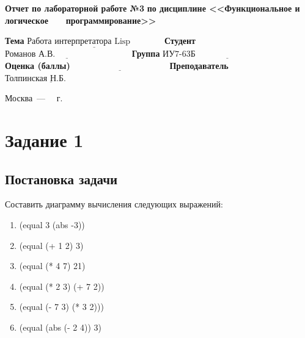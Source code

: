 \documentclass[12pt]{report}
\begin{document}
\begin{titlepage}
		\begin{center}
			\noindent\begin{minipage}{1.1\textwidth}\centering
				\Large\textbf{  Отчет по лабораторной работе №3}\newline
				\textbf{по дисциплине <<Функциональное и логическое}\newline
				\textbf{~~~программирование>>}\newline\newline
			\end{minipage}
		\end{center}
		
		\noindent\textbf{Тема} $\underline{\text{Работа интерпретатора Lisp~~~~~~~~~~~}}$\newline\newline
		\noindent\textbf{Студент} $\underline{\text{Романов А.В.~~~~~~~~~~~~~~~~~~~~~~~~~~}}$\newline\newline
		\noindent\textbf{Группа} $\underline{\text{ИУ7-63Б~~~~~~~~~~~~~~~~~~~~~~~~~~~~~~~~~~}}$\newline\newline
		\noindent\textbf{Оценка (баллы)} $\underline{\text{~~~~~~~~~~~~~~~~~~~~~~~~~~~~~~~~~}}$\newline\newline
		\noindent\textbf{Преподаватель} $\underline{\text{Толпинская Н.Б.~~~~~~~~~~~}}$\newline\newline\newline
		
		\begin{center}
			\vfill
			Москва~---~\the\year
			~г.
		\end{center}
	\end{titlepage}
	
	
	
\section*{Задание 1}
\subsection*{Постановка задачи}

Составить диаграмму вычисления следующих выражений:

\begin{enumerate}
	\item (equal 3 (abs -3))
	\item (equal (+ 1 2) 3)
	\item (equal (* 4 7) 21)
	\item (equal (* 2 3) (+ 7 2))
	\item (equal (- 7 3) (* 3 2)))
	\item (equal (abs (- 2 4)) 3)
\end{enumerate}
\end{document}
